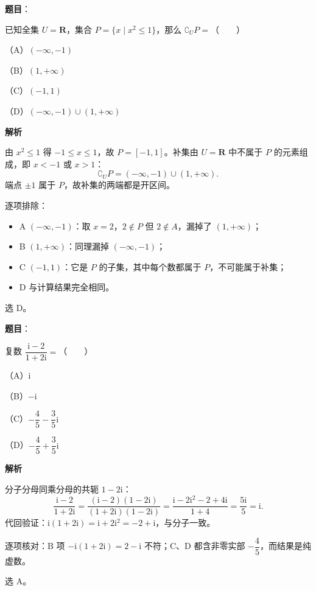 \begin{answer}

\textbf{题目}：

已知全集 $U=\mathbf R$，集合 $P=\{x\mid x^2\leqslant 1\}$，那么 $\complement_U P=$\mbox{（　　）}

（A）$(-\infty,-1)$

（B）$(1,+\infty)$

（C）$(-1,1)$

（D）$(-\infty,-1)\cup(1,+\infty)$

\textbf{解析}

由 $x^2\leqslant1$ 得 $-1\leqslant x\leqslant1$，故 $P=[-1,1]$。补集由 $U=\mathbf R$ 中不属于 $P$ 的元素组成，即 $x<-1$ 或 $x>1$：
\nopagebreak[4]
\[
\complement_U P=(-\infty,-1)\cup(1,+\infty).
\]
端点 $\pm1$ 属于 $P$，故补集的两端都是开区间。

逐项排除：

\begin{itemize}
\item A $(-\infty,-1)$：取 $x=2$，$2\notin P$ 但 $2\notin A$，漏掉了 $(1,+\infty)$；
\item B $(1,+\infty)$：同理漏掉 $(-\infty,-1)$；
\item C $(-1,1)$：它是 $P$ 的子集，其中每个数都属于 $P$，不可能属于补集；
\item D 与计算结果完全相同。
\end{itemize}

选 D。


\end{answer}
\begin{answer}

\textbf{题目}：

复数 $\dfrac{\mathrm{i}-2}{1+2\mathrm{i}}=$\mbox{（　　）}

（A）$\mathrm{i}$

（B）$-\mathrm{i}$

（C）$-\dfrac45-\dfrac35\mathrm{i}$

（D）$-\dfrac45+\dfrac35\mathrm{i}$

\textbf{解析}

分子分母同乘分母的共轭 $1-2\mathrm{i}$：
\nopagebreak[4]
\[
\frac{\mathrm{i}-2}{1+2\mathrm{i}}
=\frac{(\mathrm{i}-2)(1-2\mathrm{i})}{(1+2\mathrm{i})(1-2\mathrm{i})}
=\frac{\mathrm{i}-2\mathrm{i}^2-2+4\mathrm{i}}{1+4}
=\frac{5\mathrm{i}}{5}=\mathrm{i}.
\]
代回验证：$\mathrm{i}(1+2\mathrm{i})=\mathrm{i}+2\mathrm{i}^2=-2+\mathrm{i}$，与分子一致。

逐项核对：B 项 $-\mathrm{i}(1+2\mathrm{i})=2-\mathrm{i}$ 不符；C、D 都含非零实部 $-\dfrac45$，而结果是纯虚数。

选 A。


\end{answer}

